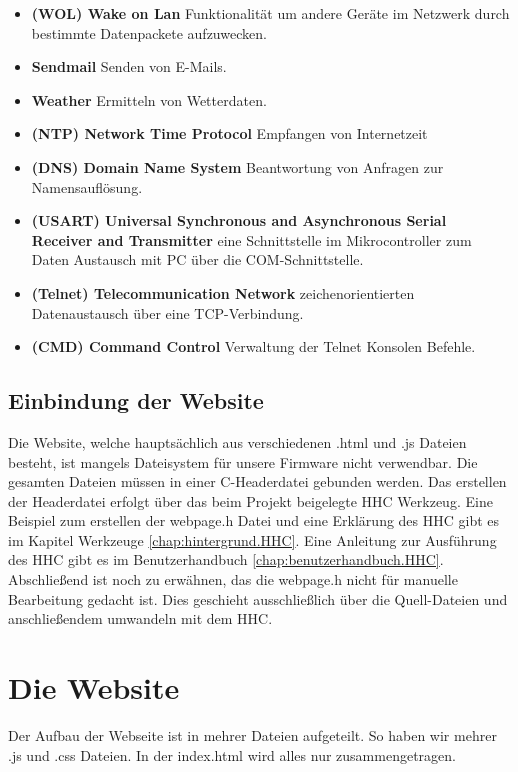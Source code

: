 \begin{itemize}
  \item \textbf{(WOL) Wake on Lan} Funktionalität um andere Geräte im Netzwerk
  durch bestimmte Datenpackete aufzuwecken.
  \item \textbf{Sendmail} Senden von E-Mails.
  \item \textbf{Weather} Ermitteln von Wetterdaten.
  \item \textbf{(NTP) Network Time Protocol} Empfangen von Internetzeit
  \item \textbf{(DNS) Domain Name System} Beantwortung von Anfragen zur
  Namensauflösung.
  \item \textbf{(USART) Universal Synchronous and Asynchronous Serial Receiver and
  Transmitter} eine Schnittstelle im Mikrocontroller zum Daten
  Austausch mit PC über die COM-Schnittstelle.
  \item \textbf{(Telnet) Telecommunication Network} zeichenorientierten
  Datenaustausch über eine TCP-Verbindung.
  \item \textbf{(CMD) Command Control} Verwaltung der Telnet Konsolen Befehle.
\end{itemize}

\subsection{Einbindung der Website}

Die Website, welche hauptsächlich aus verschiedenen .html und .js Dateien
besteht, ist mangels Dateisystem für unsere Firmware nicht verwendbar. Die
gesamten Dateien müssen in einer C-Headerdatei gebunden werden.
Das erstellen der Headerdatei erfolgt über das beim Projekt beigelegte
\ac{HHC} Werkzeug. Eine Beispiel zum erstellen der \textrm{webpage.h} 
Datei und eine Erklärung des \ac{HHC} gibt es im Kapitel Werkzeuge
\ref{chap:hintergrund.HHC}. Eine Anleitung zur Ausführung des \ac{HHC} gibt es im
Benutzerhandbuch \ref{chap:benutzerhandbuch.HHC}.
Abschließend ist noch zu erwähnen, das die \textrm{webpage.h} nicht für manuelle
Bearbeitung gedacht ist. Dies geschieht ausschließlich über die Quell-Dateien
und anschließendem umwandeln mit dem \ac{HHC}.

\section{Die Website}

Der Aufbau der Webseite ist in mehrer Dateien aufgeteilt. So haben wir mehrer
.js und .css Dateien. In der index.html wird alles nur zusammengetragen.

